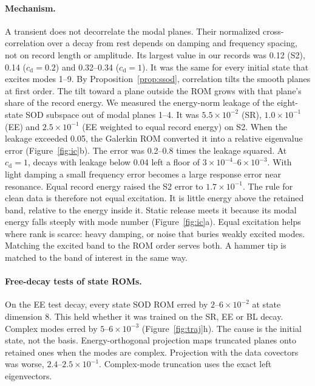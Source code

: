 \documentclass[11pt]{article}
\begin{document}
\paragraph{Mechanism.} A transient does not decorrelate the modal planes. Their normalized cross-correlation over a decay from rest depends on damping and frequency spacing, not on record length or amplitude. Its largest value in our records was 0.12 (S2), 0.14 ($c_{\mathrm d}=0.2$) and 0.32--0.34 ($c_{\mathrm d}=1$). It was the same for every initial state that excites modes 1--9.
By Proposition~\ref{prop:ssod}, correlation tilts the smooth planes at first order. The tilt toward a plane outside the ROM grows with that plane's share of the record energy.
We measured the energy-norm leakage of the eight-state SOD subspace out of modal planes 1--4. It was $5.5\times10^{-2}$ (SR), $1.0\times10^{-1}$ (EE) and $2.5\times10^{-1}$ (EE weighted to equal record energy) on S2.
When the leakage exceeded 0.05, the Galerkin ROM converted it into a relative eigenvalue error (Figure~\ref{fig:ic}b). The error was 0.2--0.8 times the leakage squared. At $c_{\mathrm d}=1$, decays with leakage below 0.04 left a floor of $3\times10^{-4}$--$6\times10^{-3}$. With light damping a small frequency error becomes a large response error near resonance. Equal record energy raised the S2 error to $1.7\times10^{-1}$.
The rule for clean data is therefore not equal excitation. It is little energy above the retained band, relative to the energy inside it. Static release meets it because its modal energy falls steeply with mode number (Figure~\ref{fig:ic}a).
Equal excitation helps where rank is scarce: heavy damping, or noise that buries weakly excited modes. Matching the excited band to the ROM order serves both. A hammer tip is matched to the band of interest in the same way.

\paragraph{Free-decay tests of state ROMs.} On the EE test decay, every state SOD ROM erred by $2$--$6\times10^{-2}$ at state dimension 8. This held whether it was trained on the SR, EE or BL decay. Complex modes erred by $5$--$6\times10^{-3}$ (Figure~\ref{fig:traj}h). The cause is the initial state, not the basis. Energy-orthogonal projection maps truncated planes onto retained ones when the modes are complex. Projection with the data covectors was worse, $2.4$--$2.5\times10^{-1}$. Complex-mode truncation uses the exact left eigenvectors.
\end{document}

